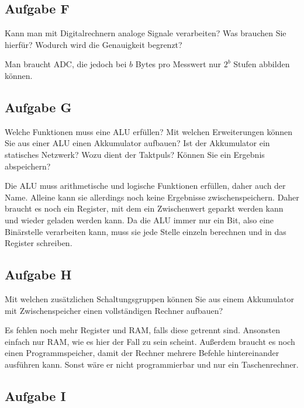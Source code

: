 \subsection{Aufgabe F}

\begin{problem}
	Kann man mit Digitalrechnern analoge Signale verarbeiten? Was brauchen Sie
	hierfür? Wodurch wird die Genauigkeit begrenzt?
\end{problem}

Man braucht ADC, die jedoch bei $b$ Bytes pro Messwert nur $2^b$ Stufen
abbilden können.

\subsection{Aufgabe G}

\begin{problem}
	Welche Funktionen muss eine ALU erfüllen? Mit welchen Erweiterungen können
	Sie aus einer ALU einen Akkumulator aufbauen? Ist der Akkumulator ein
	statisches Netzwerk? Wozu dient der Taktpuls? Können Sie ein Ergebnis
	abspeichern?
\end{problem}

Die ALU muss arithmetische und logische Funktionen erfüllen, daher auch der
Name. Alleine kann sie allerdings noch keine Ergebnisse zwischenspeichern.
Daher braucht es noch ein Register, mit dem ein Zwischenwert geparkt werden
kann und wieder geladen werden kann. Da die ALU immer nur ein Bit, also eine
Binärstelle verarbeiten kann, muss sie jede Stelle einzeln berechnen und in das
Register schreiben.

\subsection{Aufgabe H}

\begin{problem}
	Mit welchen zusätzlichen Schaltungsgruppen können Sie aus einem
	Akkumulator mit Zwischenspeicher einen vollständigen Rechner aufbauen?
\end{problem}

Es fehlen noch mehr Register und RAM, falls diese getrennt sind. Ansonsten
einfach nur RAM, wie es hier der Fall zu sein scheint. Außerdem braucht es noch
einen Programmspeicher, damit der Rechner mehrere Befehle hintereinander
ausführen kann. Sonst wäre er nicht programmierbar und nur ein Taschenrechner.

\subsection{Aufgabe I}

